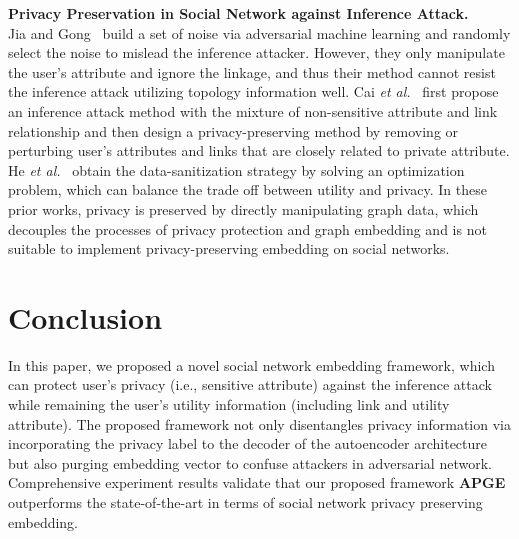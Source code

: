 \documentclass{article}
\begin{document}
\textbf{Privacy Preservation in Social Network against Inference Attack.}\\
Jia and Gong~\citep{jia2018attriguard} build a set of noise via adversarial machine learning and randomly select the noise to mislead the inference attacker. However, they only manipulate the user's attribute and ignore the linkage, and thus their method cannot resist the inference attack utilizing topology information well.
Cai {\em et al.}~\citep{cai2018collective} first propose an inference attack method with the mixture of non-sensitive attribute and link relationship and then design a privacy-preserving method by removing or perturbing user's attributes and links that are closely related to private attribute. He {\em et al.}~\citep{he2018latent} obtain the data-sanitization strategy by solving an optimization problem, which can balance the trade off between utility and privacy.
In these prior works, privacy is preserved by directly manipulating graph data, which decouples the processes of privacy protection and graph embedding and is not suitable to implement privacy-preserving embedding on social networks.



\section{Conclusion}
In this paper, we proposed a novel social network embedding framework, which can protect user's privacy (i.e., sensitive attribute) against the inference attack while remaining the user's utility information (including link and utility attribute). The proposed framework not only disentangles privacy information via  incorporating the privacy label to the decoder of the autoencoder architecture but also purging embedding vector to confuse attackers in adversarial network. Comprehensive experiment results validate that our proposed framework \textbf{APGE} outperforms the state-of-the-art in terms of social network privacy preserving embedding.



\end{document}
